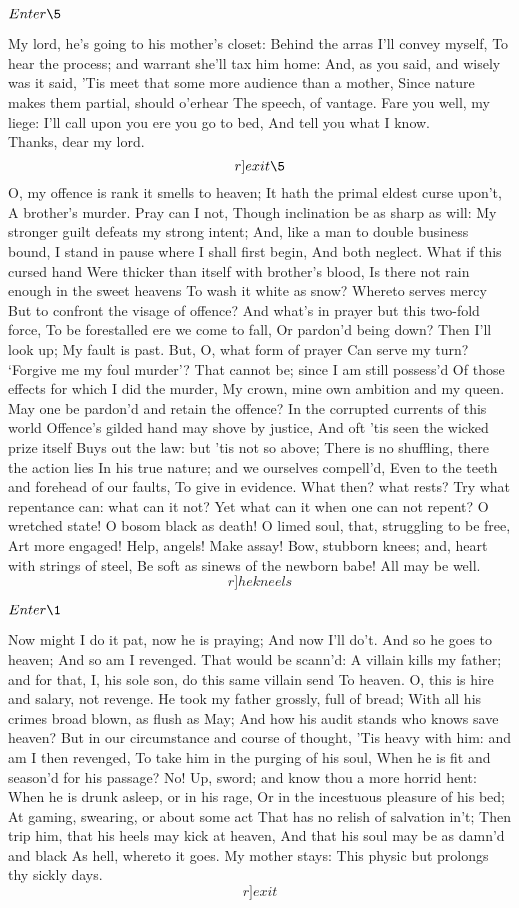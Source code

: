 \documentclass[11pt]{book}
\begin{document}
	\(Enter \5\)

\5	My lord, he's going to his mother's closet:
	Behind the arras I'll convey myself,
	To hear the process; and warrant she'll tax him home:
	And, as you said, and wisely was it said,
	'Tis meet that some more audience than a mother,
	Since nature makes them partial, should o'erhear
	The speech, of vantage. Fare you well, my liege:
	I'll call upon you ere you go to bed,
	And tell you what I know. \\

\2	Thanks, dear my lord. 	\[r]exit \5\]
	O, my offence is rank it smells to heaven;
	It hath the primal eldest curse upon't,
	A brother's murder. Pray can I not,
	Though inclination be as sharp as will:
	My stronger guilt defeats my strong intent;
	And, like a man to double business bound,
	I stand in pause where I shall first begin,
	And both neglect. What if this cursed hand
	Were thicker than itself with brother's blood,
	Is there not rain enough in the sweet heavens
	To wash it white as snow? Whereto serves mercy
	But to confront the visage of offence?
	And what's in prayer but this two-fold force,
	To be forestalled ere we come to fall,
	Or pardon'd being down? Then I'll look up;
	My fault is past. But, O, what form of prayer
	Can serve my turn? `Forgive me my foul murder'?
	That cannot be; since I am still possess'd
	Of those effects for which I did the murder,
	My crown, mine own ambition and my queen.
	May one be pardon'd and retain the offence?
	In the corrupted currents of this world
	Offence's gilded hand may shove by justice,
	And oft 'tis seen the wicked prize itself
	Buys out the law: but 'tis not so above;
	There is no shuffling, there the action lies
	In his true nature; and we ourselves compell'd,
	Even to the teeth and forehead of our faults,
	To give in evidence. What then? what rests?
	Try what repentance can: what can it not?
	Yet what can it when one can not repent?
	O wretched state! O bosom black as death!
	O limed soul, that, struggling to be free,
	Art more engaged! Help, angels! Make assay!
	Bow, stubborn knees; and, heart with strings of steel,
	Be soft as sinews of the newborn babe!
	All may be well. \[r]he kneels\]

	\(Enter \1\)

\1	Now might I do it pat, now he is praying;
	And now I'll do't. And so he goes to heaven;
	And so am I revenged. That would be scann'd:
	A villain kills my father; and for that,
	I, his sole son, do this same villain send
	To heaven.
	O, this is hire and salary, not revenge.
	He took my father grossly, full of bread;
	With all his crimes broad blown, as flush as May;
	And how his audit stands who knows save heaven?
	But in our circumstance and course of thought,
	'Tis heavy with him: and am I then revenged,
	To take him in the purging of his soul,
	When he is fit and season'd for his passage?
	No!
	Up, sword; and know thou a more horrid hent:
	When he is drunk asleep, or in his rage,
	Or in the incestuous pleasure of his bed;
	At gaming, swearing, or about some act
	That has no relish of salvation in't;
	Then trip him, that his heels may kick at heaven,
	And that his soul may be as damn'd and black
	As hell, whereto it goes. My mother stays:
	This physic but prolongs thy sickly days. \[r]exit\]
\end{document}
